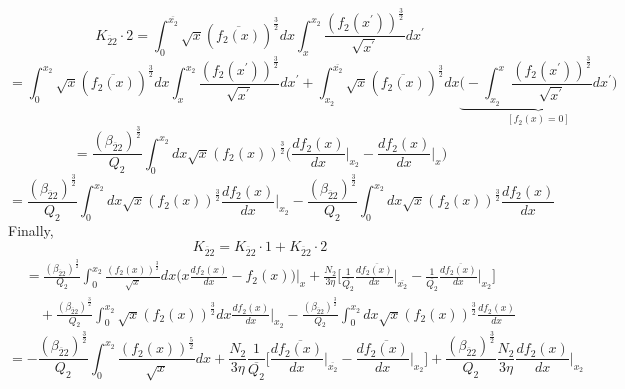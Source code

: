 \documentclass[fleqn, 10pt]{article}
\begin{document}
\begin{equation}
    K_{\overline{2}2} \cdot 2 = \int^{\overline{x_{2}}}_{0}\sqrt{x} (\overline{f_{2}(x)})^\frac{3}{2} dx \int^{x_{2}}_{x}\frac{(f_{2}(x^\prime))^\frac{3}{2}}{\sqrt{x^\prime}} dx^\prime
\end{equation}
\begin{equation*}
     = \int^{x_{2}}_{0}\sqrt{x} (\overline{f_{2}(x)})^\frac{3}{2} dx \int^{x_{2}}_{x} \frac{(f_{2}(x^\prime))^\frac{3}{2}}{\sqrt{x^\prime}}dx^\prime+ \int^{\overline{x_{2}}}_{x_{2}} \sqrt{x} (\overline{f_{2}(x)})^\frac{3}{2} dx \underbrace{\biggl( - \int^{x}_{x_{2}} \frac{(f_{2}(x^\prime))^\frac{3}{2}}{\sqrt{x^\prime}} dx^\prime\biggr)}_{[f_{2}(x) = 0]} 
\end{equation*}
\begin{equation*}
    = \frac{(\beta_{\overline{2}2})^\frac{3}{2}}{Q_{2}} \int^{x_{2}}_{0} dx \sqrt{x} (f_{2}(x))^\frac{3}{2}  \biggl( \frac{df_{2}(x)}{dx} \biggr|_{x_{2}} - \frac{df_{2}(x)}{dx} \biggr|_{x} \biggr)
\end{equation*}
\begin{equation}
     = \frac{(\beta_{\overline{2}2})^\frac{3}{2}}{Q_{2}} \int^{x_{2}}_{0} dx  \sqrt{x} (f_{2}(x))^\frac{3}{2} \frac{df_{2}(x)}{dx} \biggr|_{x_{2}} - \frac{(\beta_{\overline{2}2})^\frac{3}{2}}{Q_{2}} \int^{x_{2}}_{0} dx \sqrt{x} (f_{2}(x))^\frac{3}{2} \frac{df_{2}(x)}{dx}
\end{equation}
Finally, 
\begin{equation}
    K_{\overline{2}2} = K_{\overline{2}2} \cdot 1 + K_{\overline{2}2} \cdot 2 
\end{equation}
\begin{equation*}
\begin{split}
    &= \frac{(\beta_{\overline{2}2})^\frac{3}{2}}{Q_{2}} \int^{x_{2}}_{0} \frac{(f_{2}(x))^\frac{3}{2}}{\sqrt{x}}dx \biggl( x \frac{df_{2}(x)}{dx} -f_{2}(x) \biggr) \biggr|_{x} + \frac{N_{2}}{3\eta} \biggl[ \frac{1}{\overline{Q_{2}}} \frac{d\overline{f_{2}(x)}}{dx} \biggr|_{\overline{x_{2}}} - \frac{1}{\overline{Q_{2}}} \frac{d\overline{f_{2}(x)}}{dx} \biggr|_{x_{2}} \biggr]  \\ & \quad + \frac{(\beta_{\overline{2}2})^\frac{3}{2}}{Q_{2}} \int^{x_{2}}_{0} \sqrt{x} (f_{2}(x))^\frac{3}{2} dx \frac{df_{2}(x)}{dx} \biggr|_{x_{2}}  - \frac{(\beta_{\overline{2}2})^\frac{3}{2}}{Q_{2}} \int^{x_{2}}_{0} dx \sqrt{x} (f_{2}(x))^\frac{3}{2} \frac{df_{2}(x)}{dx}
    \end{split}
\end{equation*}
\begin{equation*}
    = - \frac{(\beta_{\overline{2}2})^\frac{3}{2}}{Q_{2}} \int^{x_{2}}_{0} \frac{(f_{2}(x))^\frac{5}{2}}{\sqrt{x}} dx + \frac{N_{2}}{3\eta} \frac{1}{\overline{Q_{2}}} \biggl[ \frac{d\overline{f_{2}(x)}}{dx} \biggr|_{\overline{x_{2}}} - \frac{d\overline{f_{2}(x)}}{dx} \biggr|_{x_{2}} \biggr] + \frac{(\beta_{\overline{2}2})^\frac{3}{2}}{Q_{2}} \frac{N_{2}}{3\eta} \frac{df_{2}(x)}{dx} \biggr|_{x_{2}}
\end{equation*}
\end{document}
